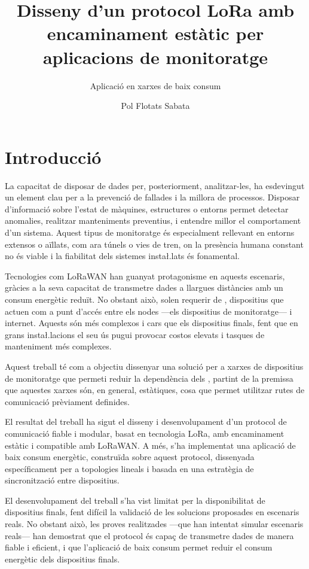 \documentclass{tfgitic}[2024/07/01]
\title{Disseny d'un protocol LoRa amb encaminament estàtic per aplicacions de monitoratge}
\subtitle{Aplicació en xarxes de baix consum}
\author{Pol Flotats Sabata}
\begin{document}
\listoffigures

\chapter{Introducció}

La capacitat de disposar de dades per, posteriorment, analitzar-les, ha esdevingut un element clau per a la prevenció de fallades i la millora de processos. Disposar d'informació sobre l'estat de màquines, estructures o entorns permet detectar anomalies, realitzar manteniments preventius, i entendre millor el comportament d'un sistema. Aquest tipus de monitoratge és especialment rellevant en entorns extensos o aïllats, com ara túnels o vies de tren, on la presència humana constant no és viable i la fiabilitat dels sistemes insta\l.lats és fonamental.

Tecnologies com LoRaWAN han guanyat protagonisme en aquests escenaris, gràcies a la seva capacitat de transmetre dades a llargues distàncies amb un consum energètic reduït. No obstant això, solen requerir de , dispositius que actuen com a punt d'accés entre els nodes ---els dispositius de monitoratge--- i internet. Aquests  són més complexos i cars que els dispositius finals, fent que en grans insta\l.lacions el seu ús pugui provocar costos elevats i tasques de manteniment més complexes.

Aquest treball té com a objectiu dissenyar una solució per a xarxes de dispositius de monitoratge que permeti reduir la dependència dels , partint de la premissa que aquestes xarxes són, en general, estàtiques, cosa que permet utilitzar rutes de comunicació prèviament definides. 

El resultat del treball ha sigut el disseny i desenvolupament d'un protocol de comunicació fiable i modular, basat en tecnologia LoRa, amb encaminament estàtic i compatible amb LoRaWAN. A més, s'ha implementat una aplicació de baix consum energètic, construïda sobre aquest protocol, dissenyada específicament per a topologies lineals i basada en una estratègia de sincronització entre dispositius. 

El desenvolupament del treball s'ha vist limitat per la disponibilitat de dispositius finals, fent difícil la validació de les solucions proposades en escenaris reals. No obstant això, les proves realitzades ---que han intentat simular escenaris reals--- han demostrat que el protocol és capaç de transmetre dades de manera fiable i eficient, i que l'aplicació de baix consum permet reduir el consum energètic dels dispositius finals.
\end{document}
